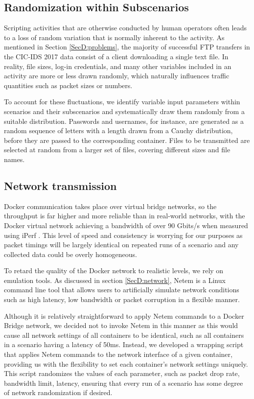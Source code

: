 \subsection{Randomization within Subscenarios}\label{SecD:randomsubscen}

Scripting activities that are otherwise conducted by human operators often leads to a loss of random variation that is normally inherent to the activity.
As mentioned in Section \ref{SecD:problems}, the majority of successful FTP transfers in the CIC-IDS 2017 data consist of a client downloading a single text file. In reality, file sizes, log-in credentials, and many other variables included in an activity are more or less drawn randomly, which naturally influences traffic quantities such as packet sizes or numbers.

To account for these fluctuations, we identify variable input parameters within scenarios and their subscenarios and systematically draw them randomly from a suitable distribution. Passwords and usernames, for instance, are generated as a random sequence of letters with a length drawn from a Cauchy distribution, before they are passed to the corresponding container. Files to be transmitted are selected at random from a larger set of files, covering different sizes and file names.


\subsection{Network transmission}\label{SecD:Netrand}


 Docker communication takes place over virtual bridge networks, so the throughput is far higher and more reliable than in real-world networks, with the Docker virtual network achieving a bandwidth of over 90 Gbits/s when measured using iPerf \cite{iperf}. This level of speed and consistency is worrying for our purposes as packet timings will be largely identical on repeated runs of a scenario and any collected data could be overly homogeneous.

To retard the quality of the Docker network to realistic levels, we rely on emulation tools. As discussed in section \ref{SecD:network}, Netem is a Linux command line tool that allows users to artificially simulate network conditions such as high latency, low bandwidth or packet corruption in a flexible manner.

Although it is relatively straightforward to apply Netem commands to a Docker Bridge network, we decided not to invoke Netem in this manner as this would cause all network settings of all containers to be identical, such as all containers in a scenario having a latency of 50ms.  Instead, we developed a wrapping script that applies Netem commands to the network interface of a given container, providing us with the flexibility to set each container's network settings uniquely. This script randomizes the values of each parameter, such as packet drop rate, bandwidth limit, latency, ensuring that every run of a scenario has some degree of network randomization if desired.

